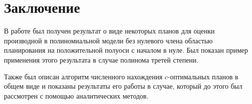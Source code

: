 \documentclass[specialist,
               substylefile = spbu.rtx,
               subf,href,colorlinks=true, 12pt]{disser}
\theoremstyle{definition}
\begin{document}
  
	
\chapter*{Заключение}
	В работе был получен результат о виде некоторых планов для оценки производной в полиномиальной модели без нулевого члена областью планирования на положительной полуоси с началом в нуле. Был показан пример применения этого результата в случае полинома третей степени.
	
	Также был описан алгоритм численного нахождения $c$-оптимальных планов в общем виде и показаны результаты его работы в случае, который до этого был рассмотрен с помощью аналитических методов.
	
	
	
	
	
	
\end{document}
